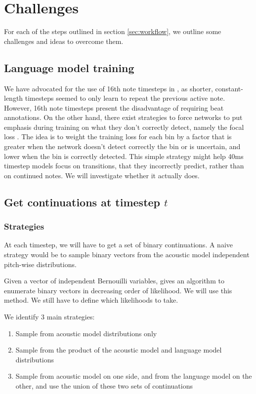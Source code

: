\documentclass{article}
\begin{document}
\section{Challenges}

For each of the steps outlined in section \ref{sec:workflow}, we outline some challenges and ideas to overcome them.

\subsection{Language model training}
\label{sec:focalloss}

We have advocated for the use of 16th note timesteps in \citep{Ycart2017}, as shorter, constant-length timesteps seemed to only learn to repeat the previous active note.
However, 16th note timesteps present the disadvantage of requiring beat annotations.
On the other hand, there exist strategies to force networks to put emphasis during training on what they don't correctly detect, namely the focal loss \citep{lin2018focal}.
The idea is to weight the training loss for each bin by a factor that is greater when the network doesn't detect correctly the bin or is uncertain, and lower when the bin is correctly detected.
This simple strategy might help 40ms timestep models focus on transitions, that they incorrectly predict, rather than on continued notes.
We will investigate whether it actually does.

\subsection{Get continuations at timestep $t$}
\label{sec:sampling}

\subsubsection{Strategies}

At each timestep, we will have to get a set of binary continuations.
A naive strategy would be to sample binary vectors from the acoustic model independent pitch-wise distributions.

Given a vector of independent Bernouilli variables, \citep{Boulanger-Lewandowski2013} gives an algorithm to enumerate binary vectors in decreasing order of likelihood.
We will use this method.
We still have to define which likelihoods to take.

We identify 3 main strategies:

\begin{enumerate}
\item Sample from acoustic model distributions only
\item Sample from the product of the acoustic model and language model distributions
\item Sample from acoustic model on one side, and from the language model on the other, and use the union of these two sets of continuations
\end{enumerate}
\end{document}
